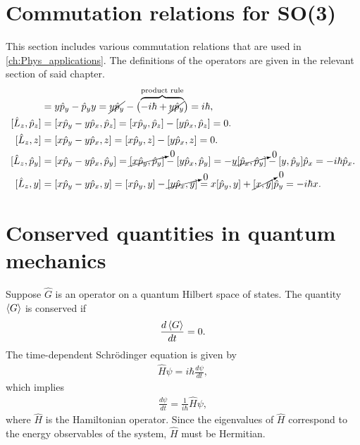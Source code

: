 \section{Commutation relations for SO(3)}\label{sec:SO3_comms}
This section includes various commutation relations that are used in \cref{ch:Phys_applications}. The definitions of the operators are given in the relevant section of said chapter.
\begin{align*}
    [y,\hat{p}_y] &= y\hat{p}_y - \hat{p}_y y = \cancel{y\hat{p}_y} - \bigl(\overbrace{-i\hbar + \cancel{y\hat{p}_y}}^{\textrm{product rule}}\bigr) = i\hbar, \\
    [\hat{L}_z,\hat{p}_z]
        &= [x\hat{p}_y - y\hat{p}_x, \hat{p}_z] = [x\hat{p}_y, \hat{p}_z] - [y\hat{p}_x, \hat{p}_z] = 0. \\
    [\hat{L}_z, z] &= [x\hat{p}_y - y\hat{p}_x, z] = [x\hat{p}_y, z] - [y\hat{p}_x, z] = 0. \\
    [\hat{L}_z,\hat{p}_y] 
        &= [x\hat{p}_y - y\hat{p}_x, \hat{p}_y] = \cancelto{0}{[x\hat{p}_y, \hat{p}_y]} - [y\hat{p}_x, \hat{p}_y] = -y\cancelto{0}{[\hat{p}_x, \hat{p}_y]} - [y, \hat{p}_y]\hat{p}_x = -i\hbar\hat{p}_x. \\
    [\hat{L}_z, y] &= [x\hat{p}_y - y\hat{p}_x, y] = [x\hat{p}_y, y] - \cancelto{0}{[y\hat{p}_x, y]} = x[\hat{p}_y, y] + \cancelto{0}{[x, y]}\hat{p}_y = -i\hbar x.
\end{align*}

\section{Conserved quantities in quantum mechanics}\label{sec:conserved_quantities}


    
    Suppose $\hat{G}$ is an operator on a quantum Hilbert space of states. The quantity $\braket{G}$ is conserved if
    \begin{align}
        \frac{d\braket{G}}{dt} = 0.
    \end{align}
    The time-dependent Schr\"odinger equation is given by
    \begin{align}
        \hat{H}\psi = i\hbar\frac{d\psi}{dt},
    \end{align}
    which implies
    \begin{align}
        \frac{d\psi}{dt} = \frac{1}{i\hbar}\hat{H}\psi,
    \end{align}
    where $\hat{H}$ is the Hamiltonian operator. Since the eigenvalues of $\hat{H}$ correspond to the energy observables of the system, $\hat{H}$ must be Hermitian.

